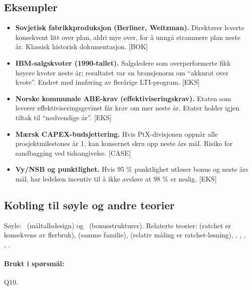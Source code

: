 \subsection*{Eksempler}
\begin{itemize}
\item \textbf{Sovjetisk fabrikkproduksjon (Berliner, Weitzman).} Direktører leverte konsekvent litt over plan, aldri mye over, for å unngå strammere plan neste år. Klassisk historisk dokumentasjon. [BOK]
\item \textbf{IBM-salgskvoter (1990-tallet).} Salgsledere som overperformerte fikk høyere kvoter neste år; resultatet var en bransjenorm om ``akkurat over kvote''. Endret med innføring av flerårige LTI-program. [EKS]
\item \textbf{Norske kommunale ABE-krav (effektiviseringskrav).} Etaten som leverer effektiviseringsgevinst får krav om mer neste år. Etater holder igjen tiltak til ``nødvendige år''. [EKS]
\item \textbf{Mærsk CAPEX-budsjettering.} Hvis PtX-divisjonen oppnår alle prosjektmilestones år 1, kan konsernet skru opp neste års mål. Risiko for sandbagging ved tidsangivelse. [CASE]
\item \textbf{Vy/NSB og punktlighet.} Hvis 95 \% punktlighet utløser bonus og neste års mål, har ledelsen incentiv til å ikke avsløre at 98 \% er mulig. [EKS]
\end{itemize}

\subsection*{Kobling til søyle og andre teorier}
Søyle: \STwo\ (måltallsdesign) og \SThree\ (bonusstrukturer). Relaterte teorier:  (ratchet er konsekvens av flerbruk),  (samme familie),  (relativ måling er ratchet-løsning), , , , , .

\paragraph{Brukt i spørsmål:} Q10.
